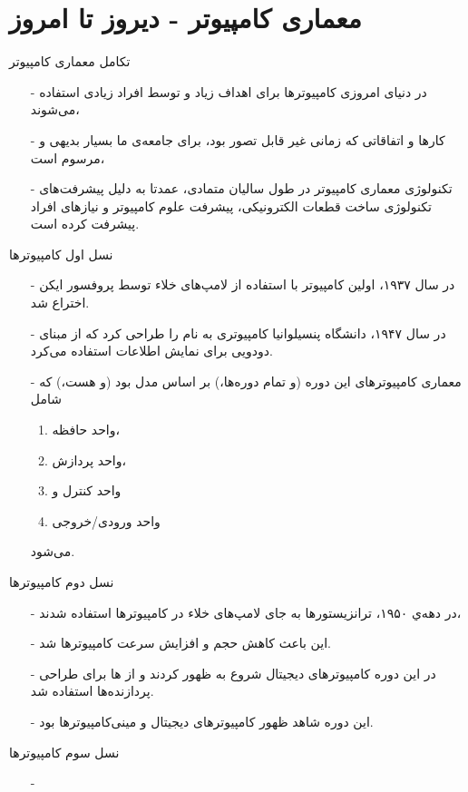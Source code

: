 \section{معماری کامپیوتر - دیروز تا امروز}
\begin{frame}{تکامل معماری کامپیوتر}
\begin{itemize}\itemr
\item[-]
در دنیای امروزی کامپیوتر‌ها برای اهداف زیاد و توسط افراد زیادی استفاده می‌شوند،
\item[-]
کارها و اتفاقاتی که زمانی غیر قابل تصور بود، برای جامعه‌ی ما بسیار بدیهی و مرسوم است،
\item[-]
تکنولوژی معماری‌ کامپیوتر در طول سالیان متمادی، عمدتا به دلیل پیشرفت‌های تکنولوژی ساخت قطعات الکترونیکی، پیشرفت علوم کامپیوتر و نیاز‌‌های افراد پیشرفت کرده است.
\end{itemize}
\end{frame}

\begin{frame}{نسل اول کامپیوتر‌ها}
\begin{itemize}\itemr
\item[-]
در سال ۱۹۳۷، اولین کامپیوتر با استفاده از لامپ‌های خلاء توسط پروفسور ایکن اختراع شد.
\item[-]
در سال ۱۹۴۷، دانشگاه پنسیلوانیا کامپیوتری به نام 
را طراحی کرد که از مبنای دودویی برای نمایش اطلاعات استفاده می‌کرد.
\item[-]
معماری کامپیوتر‌های این دوره (و تمام دوره‌ها،) بر اساس مدل 
بود (و هست،) که شامل 
\begin{enumerate}\itemr
\item 
واحد‌ حافظه،
\item 
واحد پردازش، 
\item 
واحد کنترل و
\item 
واحد ورودی/خروجی 
\end{enumerate}
می‌شود.
\end{itemize}
\end{frame}

\begin{frame}{نسل دوم کامپیوتر‌ها}
\begin{itemize}\itemr
\item[-]
در دهه‌ي ۱۹۵۰، ترانزیستور‌ها به جای لامپ‌های خلاء در کامپیوتر‌ها استفاده شدند،
\item[-]
این باعث کاهش حجم و افزایش سرعت کامپیوتر‌ها شد.
\item[-]
در این دوره کامپیوتر‌های دیجیتال شروع به ظهور کردند و از 
ها
برای طراحی پردازند‌ه‌ها استفاده شد.
\item[-]
این دوره شاهد ظهور کامپیوتر‌های دیجیتال و مینی‌کامپیوتر‌ها بود.
\end{itemize}
\end{frame}

\begin{frame}{نسل سوم کامپیوتر‌ها}
\begin{itemize}\itemr
\item[-]
\end{itemize}
\end{frame}

